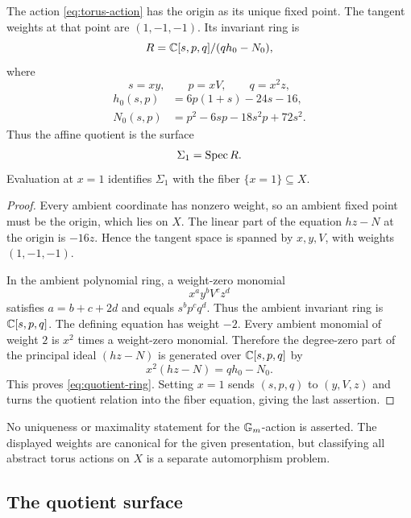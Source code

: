 \begin{proposition}\label{prop:torus-quotient}
The action \eqref{eq:torus-action} has the origin as its unique fixed point.  The tangent weights at that point are $(1,-1,-1)$.  Its invariant ring is
\begin{equation}\label{eq:quotient-ring}
  R=\mathbb C[s,p,q]/(qh_0-N_0),
\end{equation}
where
\begin{equation}\label{eq:invariants}
  s=xy,
  \qquad p=xV,
  \qquad q=x^2z,
\end{equation}
\begin{equation}\label{eq:h0N0}
\begin{aligned}
  h_0(s,p)&=6p(1+s)-24s-16,\\
  N_0(s,p)&=p^2-6sp-18s^2p+72s^2.
\end{aligned}
\end{equation}
Thus the affine quotient is the surface
\[
  \Sigma_1=\operatorname{Spec} R.
\]
Evaluation at $x=1$ identifies $\Sigma_1$ with the fiber $\{x=1\}\subseteq X$.
\end{proposition}

\begin{proof}
Every ambient coordinate has nonzero weight, so an ambient fixed point must be the origin, which lies on $X$.  The linear part of the equation $hz-N$ at the origin is $-16z$.  Hence the tangent space is spanned by $x,y,V$, with weights $(1,-1,-1)$.

In the ambient polynomial ring, a weight-zero monomial
\[
  x^ay^bV^cz^d
\]
satisfies $a=b+c+2d$ and equals $s^bp^cq^d$.  Thus the ambient invariant ring is $\mathbb C[s,p,q]$.  The defining equation has weight $-2$.  Every ambient monomial of weight $2$ is $x^2$ times a weight-zero monomial.  Therefore the degree-zero part of the principal ideal $(hz-N)$ is generated over $\mathbb C[s,p,q]$ by
\[
  x^2(hz-N)=qh_0-N_0.
\]
This proves \eqref{eq:quotient-ring}.  Setting $x=1$ sends $(s,p,q)$ to $(y,V,z)$ and turns the quotient relation into the fiber equation, giving the last assertion.
\end{proof}

\begin{remark}\label{rem:no-torus-uniqueness}
No uniqueness or maximality statement for the $\mathbb G_m$-action is asserted.  The displayed weights are canonical for the given presentation, but classifying all abstract torus actions on $X$ is a separate automorphism problem.
\end{remark}

\subsection{The quotient surface}

